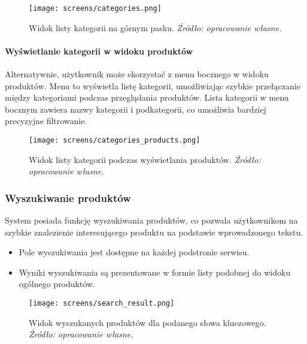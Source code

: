 \documentclass[12pt,a4paper,oneside]{article}
\theoremstyle{definition}
\numberwithin{equation}{section}
\begin{document}
\begin{figure}[H]
    \centering
    \texttt{[image: screens/categories.png]}
    \caption{Widok listy kategorii na górnym pasku. \emph{Źródło: opracowanie własne.}}
    \label{fig:categories_bar}
\end{figure}

\paragraph{Wyświetlanie kategorii w widoku produktów}
Alternatywnie, użytkownik może skorzystać z menu bocznego w widoku produktów. Menu to wyświetla listę kategorii, umożliwiając szybkie przełączanie między kategoriami podczas przeglądania produktów. Lista kategorii w menu bocznym zawiera nazwy kategorii i podkategorii, co umożliwia bardziej precyzyjne filtrowanie.

\begin{figure}[H]
    \centering
    \texttt{[image: screens/categories\_products.png]}
    \caption{Widok listy kategorii podczas wyświetlania produktów. \emph{Źródło: opracowanie własne.}}
    \label{fig:categories}
\end{figure}






\newpage
\subsubsection{Wyszukiwanie produktów}
System posiada funkcję wyszukiwania produktów, co pozwala użytkownikom na szybkie znalezienie interesującego produktu na podstawie wprowadzonego tekstu.
\begin{itemize}
    \item Pole wyszukiwania jest dostępne na każdej podstronie serwisu.
    \item Wyniki wyszukiwania są prezentowane w formie listy podobnej do widoku ogólnego produktów.
\end{itemize}

\begin{figure}[H]
    \centering
    \texttt{[image: screens/search\_result.png]}
    \caption{Widok wyszukanych produktów dla podanego słowa kluczowego. \emph{Źródło: opracowanie własne.}}
    \label{fig:search_products}
\end{figure}
\end{document}

